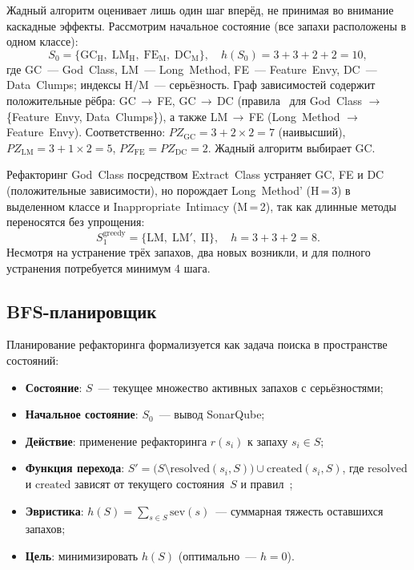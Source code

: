 \documentclass[conference]{IEEEtran}
\begin{document}
Жадный алгоритм оценивает лишь один шаг вперёд, не принимая во внимание
каскадные эффекты.
Рассмотрим начальное состояние (все запахи расположены в одном классе):
\[
  S_0 = \{\mathrm{GC_{H}},\;\mathrm{LM_{H}},\;\mathrm{FE_{M}},\;\mathrm{DC_{M}}\},
  \quad h(S_0) = 3{+}3{+}2{+}2 = 10,
\]
где GC~--- God~Class, LM~--- Long~Method, FE~--- Feature~Envy,
DC~--- Data~Clumps; индексы H/M~--- серьёзность.
Граф зависимостей содержит положительные рёбра:
GC\,$\to$\,FE, GC\,$\to$\,DC (правила~\cite{markovic2020}
для God~Class $\to$ \{Feature~Envy, Data~Clumps\}), а также
LM\,$\to$\,FE (Long~Method $\to$ Feature~Envy).
Соответственно: $PZ_{\text{GC}} = 3 + 2 \times 2 = 7$ (наивысший),
$PZ_{\text{LM}} = 3 + 1 \times 2 = 5$,
$PZ_{\text{FE}} = PZ_{\text{DC}} = 2$.
Жадный алгоритм выбирает GC.

Рефакторинг God~Class посредством Extract~Class устраняет
GC, FE и DC (положительные зависимости), но порождает
Long~Method' (H\,=\,3) в выделенном классе и Inappropriate~Intimacy
(M\,=\,2), так как длинные методы переносятся без упрощения:
\[
  S_1^{\text{greedy}} = \{\mathrm{LM},\;\mathrm{LM'},\;\mathrm{II}\},
  \quad h = 3{+}3{+}2 = 8.
\]
Несмотря на устранение трёх запахов, два новых возникли,
и для полного устранения потребуется минимум 4 шага.

\subsection{BFS-планировщик}

Планирование рефакторинга формализуется как задача поиска в пространстве
состояний:
\begin{itemize}
  \item \textbf{Состояние}: $S$~--- текущее множество активных запахов
        с серьёзностями;
  \item \textbf{Начальное состояние}: $S_0$~--- вывод SonarQube;
  \item \textbf{Действие}: применение рефакторинга $r(s_i)$
        к запаху $s_i \in S$;
  \item \textbf{Функция перехода}:
        $S' = \bigl(S \setminus \mathrm{resolved}(s_i, S)\bigr)
               \cup \mathrm{created}(s_i, S)$,
        где $\mathrm{resolved}$ и $\mathrm{created}$
        зависят от текущего состояния~$S$
        и правил~\cite{markovic2020};
  \item \textbf{Эвристика}:
        $h(S) = \sum_{s \in S} \mathrm{sev}(s)$~---
        суммарная тяжесть оставшихся запахов;
  \item \textbf{Цель}: минимизировать $h(S)$
        (оптимально~--- $h = 0$).
\end{itemize}
\end{document}
